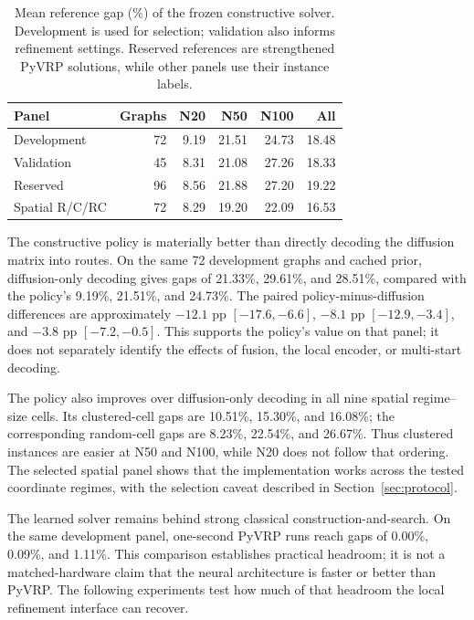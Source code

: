 \documentclass[11pt,a4paper]{article}
\begin{document}
\begin{table}[tbp]
\centering\small
\caption{Mean reference gap (\%) of the frozen constructive solver.
Development is used for selection; validation also informs refinement
settings. Reserved references are strengthened PyVRP solutions, while
other panels use their instance labels.}
\label{tab:construction}
\begin{tabular}{@{}lrrrrr@{}}
\toprule
Panel & Graphs & N20 & N50 & N100 & All\\
\midrule
Development & 72 & 9.19 & 21.51 & 24.73 & 18.48\\
Validation & 45 & 8.31 & 21.08 & 27.26 & 18.33\\
Reserved & 96 & 8.56 & 21.88 & 27.20 & 19.22\\
Spatial R/C/RC & 72 & 8.29 & 19.20 & 22.09 & 16.53\\
\bottomrule
\end{tabular}
\end{table}

The constructive policy is materially better than directly decoding the
diffusion matrix into routes. On the same 72 development graphs and
cached prior, diffusion-only decoding gives gaps of 21.33\%, 29.61\%,
and 28.51\%, compared with the policy's 9.19\%, 21.51\%, and 24.73\%.
The paired policy-minus-diffusion differences are approximately
$-12.1$ pp $[-17.6,-6.6]$, $-8.1$ pp $[-12.9,-3.4]$, and
$-3.8$ pp $[-7.2,-0.5]$. This supports the policy's value on that panel;
it does not separately identify the effects of fusion, the local encoder,
or multi-start decoding.

The policy also improves over diffusion-only decoding in all nine spatial
regime--size cells. Its clustered-cell gaps are 10.51\%, 15.30\%, and
16.08\%; the corresponding random-cell gaps are 8.23\%, 22.54\%, and
26.67\%. Thus clustered instances are easier at N50 and N100, while N20
does not follow that ordering. The selected spatial panel shows that the
implementation works across the tested coordinate regimes, with the
selection caveat described in Section~\ref{sec:protocol}.

The learned solver remains behind strong classical construction-and-search.
On the same development panel, one-second PyVRP runs reach gaps of
0.00\%, 0.09\%, and 1.11\%. This comparison establishes practical headroom;
it is not a matched-hardware claim that the neural architecture is faster
or better than PyVRP. The following experiments test how much of that
headroom the local refinement interface can recover.
\end{document}
